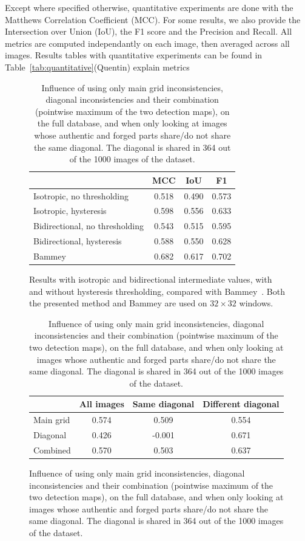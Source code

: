 \documentclass{ipol}
\newcommand{\qb}[1]{\textcolor{c1}{(Quentin) #1}}
\begin{document}
Except where specified otherwise, quantitative experiments are done with the Matthews Correlation Coefficient (MCC). For some results, we also provide the Intersection over Union (IoU), the F1 score and the Precision and Recall. All metrics are computed independantly on each image, then averaged across all images. Results tables with quantitative experiments can be found in Table~\ref{tab:quantitative}\qb{explain metrics}
\begin{table}[ht]
    \centering
        \begin{subfigure}[b]{.48\linewidth}
                \centering
            \begin{tabular}{lccc}
                    \toprule
                    &MCC&IoU&F1\\
                    \midrule
                    \scriptsize Isotropic, no thresholding&0.518&0.490&0.573\\
                    \scriptsize Isotropic, hysteresis&0.598&0.556&0.633\\
                    \scriptsize Bidirectional, no thresholding&0.543&0.515&0.595\\
                    \scriptsize Bidirectional, hysteresis&0.588&0.550&0.628\\
                    \cmidrule{1-1}
                    Bammey~\cite{bammey20}&0.682&0.617&0.702\\
                   \bottomrule
            \end{tabular}
                \caption{Results with isotropic and bidirectional intermediate values, with and without hysteresis thresholding, compared with Bammey~\cite{bammey20}. Both the presented method and Bammey are used on $32\times32$ windows.}
        \end{subfigure}\hfill%
        \begin{subfigure}[b]{.48\linewidth}
                \centering
                \begin{tabular}{lccc}
                        \toprule
                        &\scriptsize All images &\scriptsize  Same diagonal &\scriptsize  Different diagonal\\
                        \midrule
                        \scriptsize Main grid & 0.574 & 0.509 & 0.554\\
                        \scriptsize Diagonal & 0.426 & -0.001 & 0.671\\
                        \scriptsize Combined & 0.570 & 0.503 & 0.637\\
                        \bottomrule
                \end{tabular}
                \caption{Influence of using only main grid inconsistencies, diagonal inconsistencies and their combination (pointwise maximum of the two detection maps), on the full database, and when only looking at images whose authentic and forged parts share/do not share the same diagonal. The diagonal is shared in 364 out of the 1000 images of the dataset.}
        \end{subfigure}


\end{table}
\end{document}
